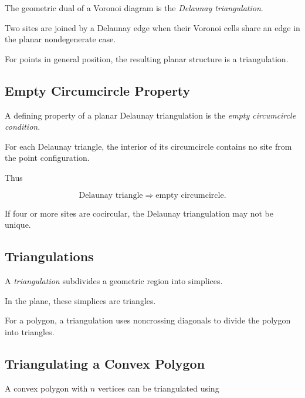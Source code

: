 The geometric dual of a Voronoi diagram is the
\emph{Delaunay triangulation}.

Two sites are joined by a Delaunay edge when their Voronoi cells share an
edge in the planar nondegenerate case.

For points in general position, the resulting planar structure is a
triangulation.

\subsection{Empty Circumcircle Property}
\label{subsec:delaunay-empty-circle}

A defining property of a planar Delaunay triangulation is the
\emph{empty circumcircle condition}.

For each Delaunay triangle, the interior of its circumcircle contains no
site from the point configuration.

Thus

\[
\boxed{
\text{Delaunay triangle}
\Longrightarrow
\text{empty circumcircle}.
}
\]

If four or more sites are cocircular, the Delaunay triangulation may not be
unique.

\subsection{Triangulations}
\label{subsec:discrete-triangulations}

A \emph{triangulation} subdivides a geometric region into simplices.

In the plane, these simplices are triangles.

For a polygon, a triangulation uses noncrossing diagonals to divide the
polygon into triangles.

\subsection{Triangulating a Convex Polygon}
\label{subsec:triangulating-convex-polygon}

A convex polygon with \(n\) vertices can be triangulated using

